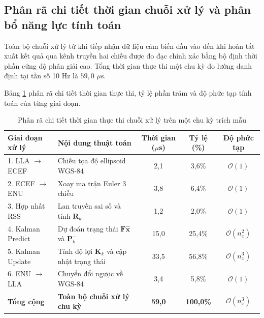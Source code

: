 \subsection{Phân rã chi tiết thời gian chuỗi xử lý và phân bổ năng lực tính toán}

\hspace{0.5cm} Toàn bộ chuỗi xử lý từ khi tiếp nhận dữ liệu cảm biến đầu vào đến khi hoàn tất xuất kết quả qua kênh truyền hai chiều được đo đạc chính xác bằng bộ định thời phần cứng độ phân giải cao. Tổng thời gian thực thi một chu kỳ đo lường danh định tại tần số 10 Hz là $59{,}0$ $\mu$s.

Bảng \ref{tab:timing-breakdown-extended} phân rã chi tiết thời gian thực thi, tỷ lệ phần trăm và độ phức tạp tính toán của từng giai đoạn.

\begin{table}[H]
\centering
\caption{Phân rã chi tiết thời gian thực thi chuỗi xử lý trên một chu kỳ trích mẫu}
\label{tab:timing-breakdown-extended}
\begin{tabularx}{\linewidth}{lXccc}
\toprule
\textbf{Giai đoạn xử lý} & \textbf{Nội dung thuật toán} & \textbf{Thời gian ($\mu$s)} & \textbf{Tỷ lệ (\%)} & \textbf{Độ phức tạp} \\
\midrule
1. LLA $\to$ ECEF & Chiếu tọa độ ellipsoid WGS-84 & 2{,}1 & 3{,}6\% & $\mathcal{O}(1)$ \\
2. ECEF $\to$ ENU & Xoay ma trận Euler 3 chiều & 3{,}8 & 6{,}4\% & $\mathcal{O}(1)$ \\
3. Hợp nhất RSS & Lan truyền sai số và tính $\mathbf{R}_k$ & 1{,}2 & 2{,}0\% & $\mathcal{O}(1)$ \\
4. Kalman Predict & Dự đoán trạng thái $\mathbf{F}\hat{\mathbf{x}}$ và $\mathbf{P}_k^-$ & 15{,}0 & 25{,}4\% & $\mathcal{O}(n_x^2)$ \\
5. Kalman Update & Tính độ lợi $\mathbf{K}_k$ và cập nhật trạng thái & 33{,}5 & 56{,}8\% & $\mathcal{O}(n_x^3)$ \\
6. ENU $\to$ LLA & Chuyển đổi ngược về WGS-84 & 3{,}4 & 5{,}8\% & $\mathcal{O}(1)$ \\
\midrule
\textbf{Tổng cộng} & \textbf{Toàn bộ chuỗi xử lý chu kỳ} & \textbf{59{,}0} & \textbf{100{,}0\%} & $\mathcal{O}(n_x^3)$ \\
\bottomrule
\end{tabularx}
\end{table}

